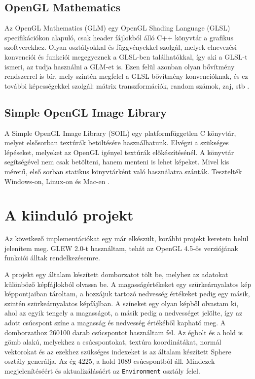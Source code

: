 \subsection{OpenGL Mathematics}

Az OpenGL Mathematics (GLM) egy OpenGL Shading Language (GLSL) specifikációkon alapuló, csak header fájlokból álló C++ könyvtár a grafikus szoftverekhez. Olyan osztályokkal és függvényekkel szolgál, melyek elnevezési konvenciói és funkciói megegyeznek a GLSL-ben találhatókkal, így aki a GLSL-t ismeri, az tudja használni a GLM-et is. Ezen felül azonban olyan bővítmény rendszerrel is bír, mely szintén megfelel a GLSL bővítmény konvencióknak, és ez további képességekkel szolgál: mátrix transzformációk, random számok, zaj, stb \cite{glm}.

\subsection{Simple OpenGL Image Library}

A Simple OpenGL Image Library (SOIL) egy platformfüggetlen C könyvtár, melyet elsősorban textúrák betöltésére használhatunk. Elvégzi a szükséges lépéseket, melyeket az OpenGL igényel textúrák előkészítésénél. A könyvtár segítségével nem csak betölteni, hanem menteni is lehet képeket. Mivel kis méretű, első sorban statikus könyvtárként való használatra szánták. Tesztelték Windows-on, Linux-on és Mac-en \cite{soil}.

\section{A kiinduló projekt}

Az következő implementációkat egy már elkészült, korábbi projekt keretein belül jelenítem meg. GLEW 2.0-t használtam, tehát az OpenGL 4.5-ös verziójának funkciói álltak rendelkezésemre. 

A projekt egy általam készített domborzatot tölt be, melyhez az adatokat különböző képfájlokból olvassa be. A magasságértékeket egy szürkeárnyalatos kép képpontjaiban tároltam, a hozzájuk tartozó nedvesség értékeket pedig egy másik, szintén szürkeárnyalatos képfájlban. A színeket egy olyan képből olvastam ki, ahol az egyik tengely a magasságot, a másik pedig a nedvességet jelölte, így az adott csúcspont színe a magasság és nedvesség értékéből kapható meg. A domborzathoz 260100 darab csúcspontot használtam fel. Az égbolt és a hold is gömb alakú, melyekhez a csúcspontokat, textúra koordinátákat, normál vektorokat és az ezekhez szükséges indexeket is az általam készített Sphere osztály generálja. Az ég 4225, a hold 1089 csúcspontból áll. Mindezek megjelenítéséért és aktualizálásáért az \texttt{Environment} osztály felel.

